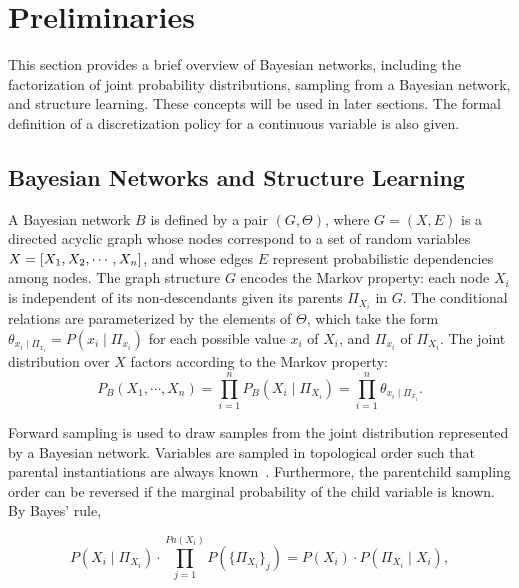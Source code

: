 
\section{Preliminaries}
\label{sec:preliminaries}
This section provides a brief overview of Bayesian networks, including the factorization of joint probability distributions, sampling from a Bayesian network, and structure learning. These concepts will be used in later sections. The formal definition of a discretization policy for a continuous variable is also given.

\subsection{Bayesian Networks and Structure Learning}

A Bayesian network $B$ is defined by a pair $(G,\Theta)$, where $G = (X,E)$ is a directed acyclic graph whose nodes correspond to a set of random variables $X = \brock{X_1, X_2, \cdots, X_n}$, and whose edges $E$ represent probabilistic dependencies among nodes. The graph structure $G$ encodes the Markov property: each node $X_i$ is independent of its non-descendants given its parents $\Pi_{X_i}$ in $G$. The conditional relations are parameterized by the elements of $\Theta$, which take the form $\theta_{x_i \mid \Pi_{x_i}} = P(x_i \mid \Pi_{x_i})$ for each possible value $x_i$ of $X_i$, and $\Pi_{x_i}$ of $\Pi_{X_i}$. The joint distribution over $X$ factors according to the Markov property:
\begin{equation}
P_B (X_1 , \cdots, X_n) = \prod_{i=1}^{n} P_B (X_i \mid \Pi_{X_i}) = \prod_{i=1}^{n} \theta_{x_i \mid \Pi_{x_i}}\text{.}
\end{equation}

Forward sampling is used to draw samples from the joint distribution represented by a Bayesian network.
Variables are sampled in topological order such that parental instantiations are always known~\citep[see][chap.~22]{algo_2009}.
Furthermore, the parent\rightarrow child sampling order can be reversed if the marginal probability of the child variable is known.
By Bayes' rule,

\begin{equation}
P(X_i \mid \Pi_{X_i}) \cdot \prod_{j = 1}^{ Pa( X_i)} P( \{ \Pi_{X_i} \}_j) = P(X_i) \cdot P(\Pi_{X_i} \mid X_i),
\end{equation}

